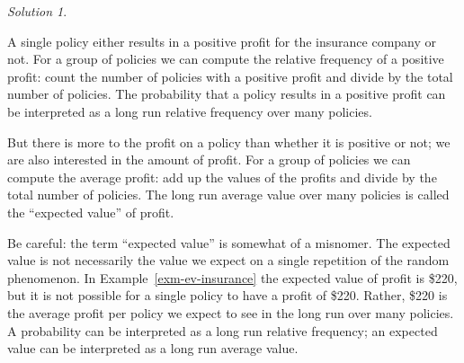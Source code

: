 \documentclass[
  letterpaper,
  DIV=11,
  numbers=noendperiod]{scrreprt}
\theoremstyle{plain}
\theoremstyle{definition}
\theoremstyle{definition}
\theoremstyle{definition}
\theoremstyle{remark}
\newtheorem{refsolution}{Solution}[chapter]
\begin{document}
\begin{tcolorbox}
\begin{refsolution}
\label{sol-ev-insurance}

\end{refsolution}

\end{tcolorbox}

A single policy either results in a positive profit for the insurance
company or not. For a group of policies we can compute the relative
frequency of a positive profit: count the number of policies with a
positive profit and divide by the total number of policies. The
probability that a policy results in a positive profit can be
interpreted as a long run relative frequency over many policies.

But there is more to the profit on a policy than whether it is positive
or not; we are also interested in the amount of profit. For a group of
policies we can compute the average profit: add up the values of the
profits and divide by the total number of policies. The long run average
value over many policies is called the ``expected value'' of profit.

Be careful: the term ``expected value'' is somewhat of a misnomer. The
expected value is not necessarily the value we expect on a single
repetition of the random phenomenon. In Example~\ref{exm-ev-insurance}
the expected value of profit is \$220, but it is not possible for a
single policy to have a profit of \$220. Rather, \$220 is the average
profit per policy we expect to see in the long run over many policies. A
probability can be interpreted as a long run relative frequency; an
expected value can be interpreted as a long run average value.
\end{document}
